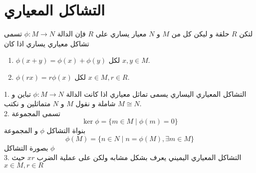 \section{التشاكل المعياري}

\begin{definition}
	لتكن $R$ حلقة و ليكن كل من $M$ و $N$ معيار يساري على $R$ فإن الدالة $\phi:M\to N$ تسمى تشاكل معياري يساري اذا كان 
	\begin{enumerate}
		\item $\phi(x+y) = \phi(x) + \phi(y)$ لكل $x,y\in M$.
		\item $\phi(rx) = r\phi(x)$ لكل $x\in M, r\in R$.  
	\end{enumerate}
\end{definition}

\begin{note}
1.	التشاكل المعياري اليساري يسمى تماثل معياري  اذا كانت الدالة $\phi:M\to N$ تباين و شاملة و نقول $M$ و $N$ متماثلين  و نكتب $M\cong N$.\\
2. تسمى المجموعة 
\[
\ker\phi = \{m\in M\mid \phi(m) = 0\}
\]
بنواة التشاكل $\phi$ و المجموعة 
\[
\phi(M) = \{ n\in N \mid n = \phi(M), \exists m\in M\}
\]
بصورة التشاكل $\phi$\\
3. التشاكل المعياري اليميني يعرف بشكل مشابه ولكن على عملية الضرب $xr$ حيث $x\in M, r\in R$
\end{note}


